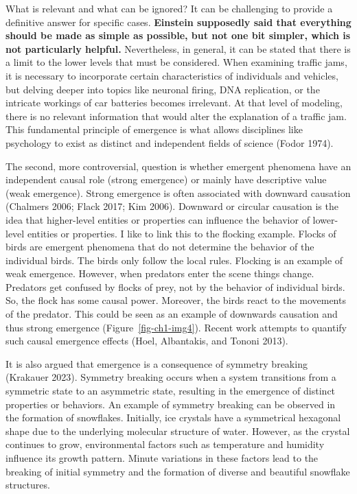\documentclass[
  letterpaper,
]{scrbook}
\begin{document}
What is relevant and what can be ignored? It can be challenging to
provide a definitive answer for specific cases. \textbf{Einstein
supposedly said that everything should be made as simple as possible,
but not one bit simpler, which is not particularly helpful.}
Nevertheless, in general, it can be stated that there is a limit to the
lower levels that must be considered. When examining traffic jams, it is
necessary to incorporate certain characteristics of individuals and
vehicles, but delving deeper into topics like neuronal firing, DNA
replication, or the intricate workings of car batteries becomes
irrelevant. At that level of modeling, there is no relevant information
that would alter the explanation of a traffic jam. This fundamental
principle of emergence is what allows disciplines like psychology to
exist as distinct and independent fields of science (Fodor 1974).

The second, more controversial, question is whether emergent phenomena
have an independent causal role (strong emergence) or mainly have
descriptive value (weak emergence). Strong emergence is often associated
with downward causation (Chalmers 2006; Flack 2017; Kim 2006). Downward
or circular causation is the idea that higher-level entities or
properties can influence the behavior of lower-level entities or
properties. I like to link this to the flocking example. Flocks of birds
are emergent phenomena that do not determine the behavior of the
individual birds. The birds only follow the local rules. Flocking is an
example of weak emergence. However, when predators enter the scene
things change. Predators get confused by flocks of prey, not by the
behavior of individual birds. So, the flock has some causal power.
Moreover, the birds react to the movements of the predator. This could
be seen as an example of downwards causation and thus strong emergence
(Figure~\ref{fig-ch1-img4}). Recent work attempts to quantify such
causal emergence effects (Hoel, Albantakis, and Tononi 2013).

It is also argued that emergence is a consequence of symmetry breaking
(Krakauer 2023). Symmetry breaking occurs when a system transitions from
a symmetric state to an asymmetric state, resulting in the emergence of
distinct properties or behaviors. An example of symmetry breaking can be
observed in the formation of snowflakes. Initially, ice crystals have a
symmetrical hexagonal shape due to the underlying molecular structure of
water. However, as the crystal continues to grow, environmental factors
such as temperature and humidity influence its growth pattern. Minute
variations in these factors lead to the breaking of initial symmetry and
the formation of diverse and beautiful snowflake structures.
\end{document}
